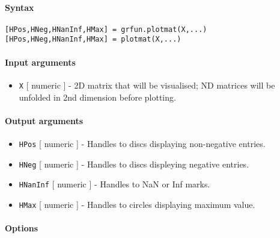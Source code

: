 


	\paragraph{Syntax}

\begin{verbatim}
[HPos,HNeg,HNanInf,HMax] = grfun.plotmat(X,...)
[HPos,HNeg,HNanInf,HMax] = plotmat(X,...)
\end{verbatim}

\paragraph{Input arguments}

\begin{itemize}
\itemsep1pt\parskip0pt
\item
  \texttt{X} {[} numeric {]} - 2D matrix that will be visualised; ND
  matrices will be unfolded in 2nd dimension before plotting.
\end{itemize}

\paragraph{Output arguments}

\begin{itemize}
\item
  \texttt{HPos} {[} numeric {]} - Handles to discs displaying
  non-negative entries.
\item
  \texttt{HNeg} {[} numeric {]} - Handles to discs displeying negative
  entries.
\item
  \texttt{HNanInf} {[} numeric {]} - Handles to NaN or Inf marks.
\item
  \texttt{HMax} {[} numeric {]} - Handles to circles displaying maximum
  value.
\end{itemize}

\paragraph{Options}

